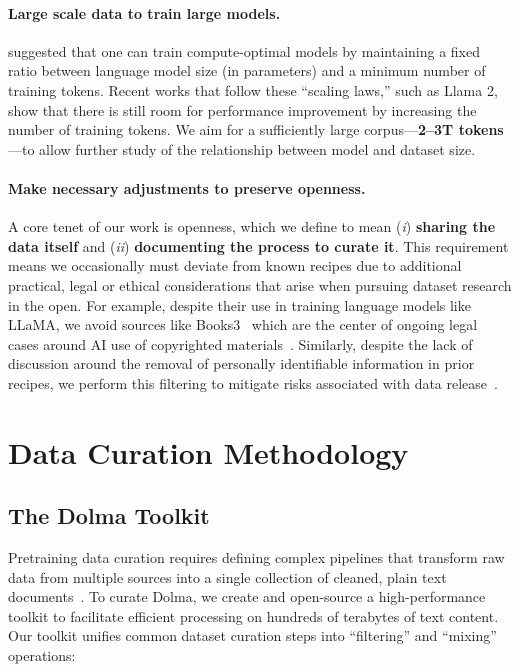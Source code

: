 \documentclass{article}
\newcommand{\dolma}{Dolma\xspace}
\begin{document}
\paragraph{Large scale data to train large models.} 
\citet{Hoffmann2022TrainingCL}  suggested that one can train compute-optimal models by maintaining a fixed ratio between language model size (in parameters) and a minimum number of training tokens. Recent works that follow these ``scaling laws,'' such as Llama 2, show that there is still room for performance improvement by increasing the number of training tokens.
We aim for a sufficiently large corpus---\textbf{2--3T tokens}---to allow further study of the relationship between model and dataset size.

\paragraph{Make necessary adjustments to preserve openness.}
A core tenet of our work is openness, which we define to mean (\textit{i}) \textbf{sharing the data itself} and (\textit{ii}) \textbf{documenting the process to curate it}. 
This requirement means we occasionally must deviate from known recipes due to additional practical, legal or ethical considerations that arise when pursuing dataset research in the open.
For example, despite their use in training language models like LLaMA, we avoid sources like Books3~\citep{Gao2020ThePA} which are the center of ongoing legal cases around AI use of copyrighted materials~\citep{books3copyright}.
Similarly, despite the lack of discussion around the removal of personally identifiable information in prior recipes, we perform this filtering to mitigate risks associated with data release~\citep{subramani-etal-2023-detecting}. 

\section{Data Curation Methodology}
\label{sec:creation}

\subsection{The \dolma Toolkit}
\label{sec:toolkit}
Pretraining data curation requires defining complex pipelines that transform raw data from multiple sources into a single collection of cleaned, plain text documents~\citep{wenzek-etal-2020-ccnet,falcon40b}.
To curate \dolma, we create and open-source a high-performance toolkit to facilitate efficient processing on hundreds of terabytes of text content.
Our toolkit unifies common dataset curation steps into ``filtering'' and ``mixing'' operations: 
\end{document}
